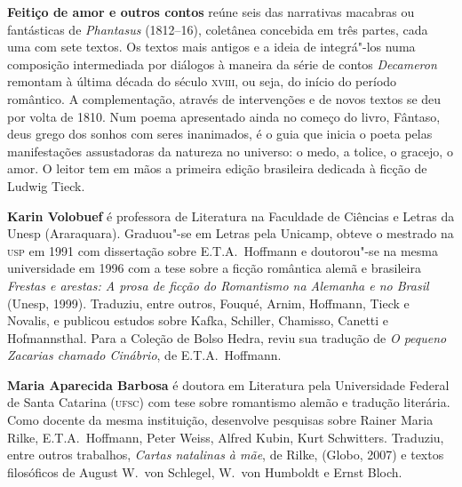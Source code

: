 


\textbf{Feitiço de amor e outros contos} reúne seis das narrativas macabras ou fantásticas de 
\textit{Phantasus} (1812--16), coletânea concebida em três partes, 
cada uma com sete textos. Os textos mais antigos e a ideia de integrá"-los 
numa composição intermediada por diálogos à maneira da série de contos 
\textit{Decameron} remontam à última década do século \textsc{xviii}, 
ou seja, do início do período romântico. A complementação, 
através de intervenções e de novos textos se deu por volta 
de 1810. Num poema apresentado ainda no começo do livro, Fântaso, 
deus grego dos sonhos com seres inanimados, é o guia que inicia o 
poeta pelas manifestações assustadoras da natureza no universo: 
o medo, a tolice, o gracejo, o amor. O leitor tem em mãos a primeira 
edição brasileira dedicada à ficção de Ludwig Tieck.   
        
\textbf{Karin Volobuef} é professora de Literatura na Faculdade de Ciências e
Letras da Unesp (Araraquara). Graduou"-se em Letras pela Unicamp, obteve
o mestrado na \textsc{usp} em 1991 com dissertação sobre E.T.A.~Hoffmann e doutorou"-se
na mesma universidade em 1996 com a tese sobre a ficção romântica alemã 
e brasileira \textit{Frestas e arestas: A prosa de ficção do Romantismo 
na Alemanha e no Brasil} (Unesp, 1999). Traduziu, entre outros, 
Fouqué, Arnim, Hoffmann, Tieck e Novalis, e publicou estudos sobre Kafka, 
Schiller, Chamisso, Canetti e Hofmannsthal. Para a Coleção de Bolso Hedra, 
reviu sua tradução de \textit{O pequeno Zacarias chamado Cinábrio}, de E.T.A.~Hoffmann. 

\textbf{Maria Aparecida Barbosa} é doutora em Literatura pela Universidade
Federal de Santa Catarina (\textsc{ufsc}) com tese sobre romantismo alemão e tradução 
literária. Como docente da mesma instituição, desenvolve pesquisas sobre Rainer 
Maria Rilke, E.T.A.~Hoffmann, Peter Weiss, Alfred Kubin, Kurt Schwitters. 
Traduziu, entre outros trabalhos, \textit{Cartas natalinas à mãe}, de Rilke, (Globo, 2007) 
e textos filosóficos de August W.~von Schlegel, W.~von Humboldt e Ernst Bloch.


